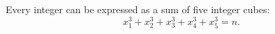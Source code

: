 \begin{proposition}
    Every integer can be expressed as a sum of five integer cubes:
\[
    x_1^3+x_2^3+x_3^3+x_4^3+x_5^3=n.
\]
\end{proposition}
